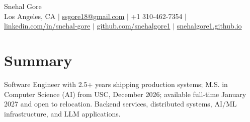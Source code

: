 \documentclass[letterpaper,10pt]{article}
\begin{document}
\begin{center}
  {\Huge Snehal Gore}\\ \vspace{2pt}
  \footnotesize Los Angeles, CA $|$
  \href{mailto:ssgore18@gmail.com}{ssgore18@gmail.com} $|$ +1 310-462-7354 $|$
  \href{https://linkedin.com/in/snehal-gore}{linkedin.com/in/snehal-gore} $|$
  \href{https://github.com/snehalgore1}{github.com/snehalgore1} $|$
  \href{https://snehalgore1.github.io}{snehalgore1.github.io}
\end{center}
\vspace{-8pt}

\section{Summary}
\small Software Engineer with 2.5+ years shipping production systems; M.S. in Computer Science (AI) from USC, December 2026; available full-time January 2027 and open to relocation. Backend services, distributed systems, AI/ML infrastructure, and LLM applications.
\end{document}
